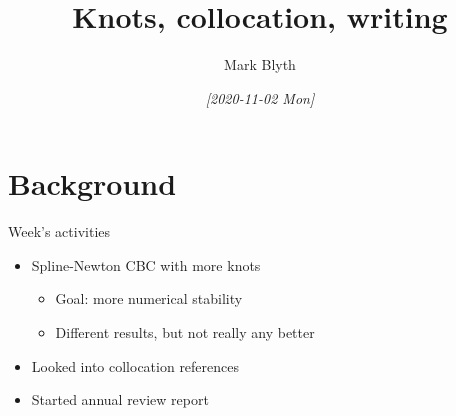 \documentclass[presentation]{beamer}
\author{Mark Blyth}
\date{\textit{[2020-11-02 Mon]}}
\title{Knots, collocation, writing}
\begin{document}
\maketitle

\section{Background}
\label{sec:org742cc8f}
\begin{frame}[label={sec:org6695432}]{Week's activities}
\begin{itemize}
\item Spline-Newton CBC with more knots
\begin{itemize}
\item Goal: more numerical stability
\item Different results, but not really any better
\end{itemize}
\end{itemize}
\vfill
\begin{itemize}
\item Looked into collocation references
\end{itemize}
\vfill
\begin{itemize}
\item Started annual review report
\end{itemize}
\end{frame}
\end{document}
